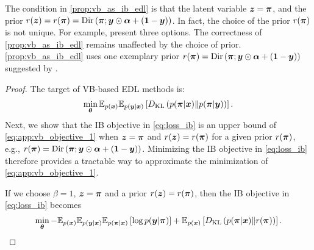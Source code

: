 \begin{remark}
The condition in \cref{prop:vb_as_ib_edl} is that the latent variable $\bm{z} = \bm{\pi}$, and the prior $r(\bm{z}) = r(\bm{\pi}) = \text{Dir}\left( \bm{\pi}; \bm{y} \odot \bm{\alpha} + (\bm{1} - \bm{y}) \right)$. In fact, the choice of the prior $r(\bm{\pi})$ is not unique. For example, \citet{chen2018variational} present three options. The correctness of \cref{prop:vb_as_ib_edl} remains unaffected by the choice of prior. \cref{prop:vb_as_ib_edl} uses one exemplary prior $r(\bm{\pi}) = \text{Dir}\left( \bm{\pi}; \bm{y} \odot \bm{\alpha} + (\bm{1} - \bm{y}) \right)$ suggested by \citet{chen2018variational}. 
\end{remark}

\begin{proof}
The target of VB-based EDL methods is:
\begin{equation}
    \begin{aligned}
        \min_{\bm{\theta}} \mathbb{E}_{p(\bm{x})} \mathbb{E}_{p(\bm{y} | \bm{x})} \left[ D_{\text{KL}}\left(p(\bm{\pi} | \bm{x}) \| p(\bm{\pi} | \bm{y})  \right)\right].
    \end{aligned}
    \label{eq:app:vb_objective_1}
\end{equation}
Next, we show that the IB objective in \cref{eq:loss_ib} is an upper bound of \cref{eq:app:vb_objective_1}  when $\bm{z} = \bm{\pi}$ and $r(\bm{z}) = r(\bm{\pi})$ for a given prior $r(\bm{\pi})$, e.g., $r(\bm{\pi}) = \text{Dir}\left( \bm{\pi}; \bm{y} \odot \bm{\alpha} + (\bm{1} - \bm{y}) \right)$.
Minimizing the IB objective in \cref{eq:loss_ib} therefore provides a tractable way to approximate the minimization of \cref{eq:app:vb_objective_1}.

If we choose $\beta=1$, $\bm{z} = \bm{\pi}$ and a prior $r(\bm{z}) = r(\bm{\pi})$, then the IB objective in \cref{eq:loss_ib} becomes
\begin{equation} \label{eq:temp_ib_obj}
    \begin{aligned}
        \min_{\bm{\theta}} - \mathbb{E}_{p(\bm{x})} \mathbb{E}_{p(\bm{y}| \bm{x})} \mathbb{E}_{p(\bm{\pi} | \bm{x})} \left[ \log p(\bm{y} | \bm{\pi}) \right] + \mathbb{E}_{p(\bm{x})}\left[D_{\text{KL}}\left(p(\bm{\pi} | \bm{x}) \| r(\bm{\pi})  \right)\right].
    \end{aligned}
\end{equation}


\end{proof}
